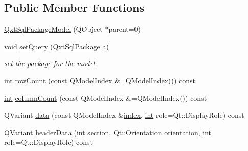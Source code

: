 \subsection*{Public Member Functions}
\begin{DoxyCompactItemize}
\item 
\hyperlink{class_qxt_sql_package_model_a09fd322bc71a23748af97691f03b8bbe}{Qxt\-Sql\-Package\-Model} (Q\-Object $\ast$parent=0)
\begin{DoxyCompactList}\small\item\em \end{DoxyCompactList}\item 
\hyperlink{group___u_a_v_objects_plugin_ga444cf2ff3f0ecbe028adce838d373f5c}{void} \hyperlink{class_qxt_sql_package_model_af2178db1f14cf5e5811c7d901a34045a}{set\-Query} (\hyperlink{class_qxt_sql_package}{Qxt\-Sql\-Package} \hyperlink{glext_8h_ac8729153468b5dcf13f971b21d84d4e5}{a})
\begin{DoxyCompactList}\small\item\em set the {\itshape package} for the model. \end{DoxyCompactList}\item 
\hyperlink{ioapi_8h_a787fa3cf048117ba7123753c1e74fcd6}{int} \hyperlink{class_qxt_sql_package_model_a21456cff3ad42ec641fe3376d5216bef}{row\-Count} (const Q\-Model\-Index \&=Q\-Model\-Index()) const 
\begin{DoxyCompactList}\small\item\em \end{DoxyCompactList}\item 
\hyperlink{ioapi_8h_a787fa3cf048117ba7123753c1e74fcd6}{int} \hyperlink{class_qxt_sql_package_model_ae18b3f7b42e230c4a7c372f348b43956}{column\-Count} (const Q\-Model\-Index \&=Q\-Model\-Index()) const 
\begin{DoxyCompactList}\small\item\em \end{DoxyCompactList}\item 
Q\-Variant \hyperlink{class_qxt_sql_package_model_ace647c36d8cc405fa5df8f017dd036f4}{data} (const Q\-Model\-Index \&\hyperlink{glext_8h_ab47dd9958bcadea08866b42bf358e95e}{index}, \hyperlink{ioapi_8h_a787fa3cf048117ba7123753c1e74fcd6}{int} role=Qt\-::\-Display\-Role) const 
\begin{DoxyCompactList}\small\item\em \end{DoxyCompactList}\item 
Q\-Variant \hyperlink{class_qxt_sql_package_model_aac0952e253bf5d9af01bed298da628f4}{header\-Data} (\hyperlink{ioapi_8h_a787fa3cf048117ba7123753c1e74fcd6}{int} section, Qt\-::\-Orientation orientation, \hyperlink{ioapi_8h_a787fa3cf048117ba7123753c1e74fcd6}{int} role=Qt\-::\-Display\-Role) const 
\begin{DoxyCompactList}\small\item\em \end{DoxyCompactList}\end{DoxyCompactItemize}


